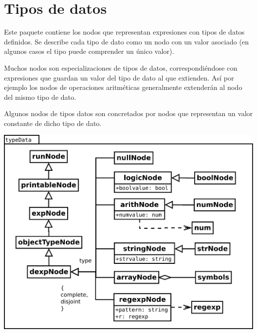 \section{Tipos de datos}
Este paquete contiene los nodos que representan expresiones con tipos de datos definidos.
Se describe cada tipo de dato como un nodo con un valor asociado (en algunos casos el tipo puede comprender un único valor).

Muchos nodos son especializaciones de tipos de datos, correspondiéndose con expresiones que 
guardan un valor del tipo de dato al que extienden. Así por ejemplo los nodos de operaciones aritméticas
generalmente extenderán al nodo del mismo tipo de dato. 

Algunos nodos de tipos datos son concretados por nodos que representan un valor constante de dicho tipo de dato.
 
\begin{center}
\includegraphics[scale=0.4]{typeData.png} \\
\end{center}
\pagebreak
